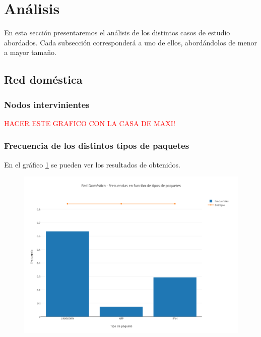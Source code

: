 

\section{An\'alisis}

En esta secci\'on presentaremos el an\'alisis de los distintos casos de estudio abordados. Cada subsecci\'on corresponder\'a a uno de ellos, abord\'andolos de menor a mayor tamaño.

\subsection{Red dom\'estica}

\subsubsection{Nodos intervinientes}
\textcolor{red}{HACER ESTE GRAFICO CON LA CASA DE MAXI!}



\subsubsection{Frecuencia de los distintos tipos de paquetes}

En el gr\'afico \ref{domesticaPaquetes} se pueden ver los resultados de obtenidos.

\begin{figure}[h!]
    \centering                                                       
    \includegraphics[width=400pt]{img/DomesticaFrecuenciaVsTipoPaquetes}
    \caption{}
    \label{domesticaPaquetes}
\end{figure}

